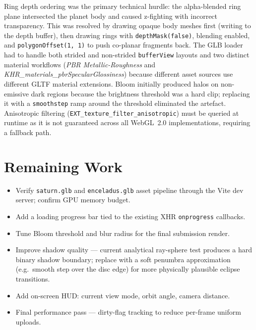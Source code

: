 \documentclass[11pt,a4paper]{article}
\begin{document}
Ring depth ordering was the primary technical hurdle: the alpha-blended ring
plane intersected the planet body and caused z-fighting with incorrect
transparency.
This was resolved by drawing opaque body meshes first (writing to the depth
buffer), then drawing rings with \texttt{depthMask(false)}, blending enabled,
and \texttt{polygonOffset(1,\,1)} to push co-planar fragments back.
The GLB loader had to handle both strided and non-strided \texttt{bufferView}
layouts and two distinct material workflows
(\textit{PBR Metallic-Roughness} and \textit{KHR\_materials\_pbrSpecularGlossiness})
because different asset sources use different GLTF material extensions.
Bloom initially produced halos on non-emissive dark regions because the
brightness threshold was a hard clip; replacing it with a \texttt{smoothstep}
ramp around the threshold eliminated the artefact.
Anisotropic filtering (\texttt{EXT\_texture\_filter\_anisotropic}) must be
queried at runtime as it is not guaranteed across all WebGL~2.0 implementations,
requiring a fallback path.

\section{Remaining Work}

\begin{itemize}
  \item Verify \texttt{saturn.glb} and \texttt{enceladus.glb} asset pipeline
        through the Vite dev server; confirm GPU memory budget.
  \item Add a loading progress bar tied to the existing XHR
        \texttt{onprogress} callbacks.
  \item Tune Bloom threshold and blur radius for the final submission render.
  \item Improve shadow quality --- current analytical ray-sphere test produces
        a hard binary shadow boundary; replace with a soft penumbra approximation
        (e.g.\ smooth step over the disc edge) for more physically plausible
        eclipse transitions.
  \item Add on-screen HUD: current view mode, orbit angle, camera distance.
  \item Final performance pass --- dirty-flag tracking to reduce per-frame
        uniform uploads.
\end{itemize}

\end{document}
